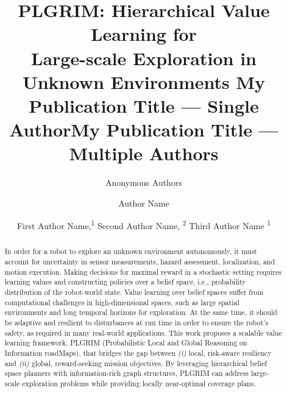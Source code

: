 \documentclass[letterpaper]{article} %
\title{
    PLGRIM: Hierarchical Value Learning for \\Large-scale Exploration in Unknown Environments
}
\author{
    Anonymous Authors \\  %
}
\title{My Publication Title --- Single Author}
\author {
    Author Name \\
}
\title{My Publication Title --- Multiple Authors}
\author {
    First Author Name,\textsuperscript{\rm 1}
    Second Author Name, \textsuperscript{\rm 2}
    Third Author Name \textsuperscript{\rm 1} \\
}
\newcommand{\gautam}[1]{{\color{cyan}Gautam: #1 }}
\begin{document}
\maketitle

\begin{abstract}
In order for a robot to explore an unknown environment autonomously, it must account for uncertainty in sensor measurements, hazard assessment, localization, and motion execution.
Making decisions for maximal reward in a stochastic setting requires learning values and constructing policies over a belief space, i.e., probability distribution of the robot-world state.
Value learning over belief spaces suffer from computational challenges in high-dimensional spaces, such as large spatial environments and long temporal horizons for exploration. %
At the same time, it should be adaptive and resilient to disturbances at run time in order to ensure the robot's safety, as required in many real-world applications.
This work proposes a scalable value learning framework, PLGRIM (Probabilistic Local and Global Reasoning on Information roadMaps), that bridges the gap between \textit{(i)} local, risk-aware resiliency and \textit{(ii)} global, reward-seeking mission objectives.  
By leveraging hierarchical belief space planners with information-rich graph structures, PLGRIM can address large-scale exploration problems while providing locally near-optimal coverage plans. %

\end{abstract}
\end{document}
